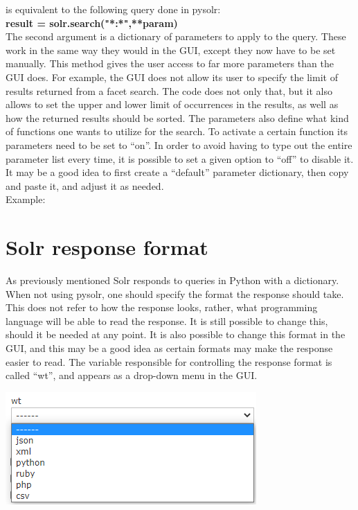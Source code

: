 \documentclass[a4paper,english]{report}
\begin{document}
is equivalent to the following query done in pysolr:\\



\textbf{result = solr.search("*:*",**param)}\\

The second argument is a dictionary of parameters to apply to the query. These work in the same way they would in the GUI, except they now have to be set manually. This method gives the user access to far more parameters than the GUI does.
For example, the GUI does not allow its user to specify the limit of results returned from a facet search. The code does not only that, but it also allows to set the upper and lower limit of occurrences in the results, as well as how the returned results should be sorted. 
The parameters also define what kind of functions one wants to utilize for the search. To activate a certain function its parameters need to be set to “on”. In order to avoid having to type out the entire parameter list every time, it is possible to set a given option to “off” to disable it. It may be a good idea to first create a “default” parameter dictionary, then copy and paste it, and adjust it as needed.\\

Example: 




\section{Solr response format}

As previously mentioned Solr responds to queries in Python with a dictionary. When not using pysolr, one should specify the format the response should take. This does not refer to how the response looks, rather, what programming language will be able to read the response. It is still possible to change this, should it be needed at any point. It is also possible to change this format in the GUI, and this may be a good idea as certain formats may make the response easier to read.
The variable responsible for controlling the response format is called “wt”, and appears as a drop-down menu in the GUI. 

\includegraphics{gui2}
\end{document}
